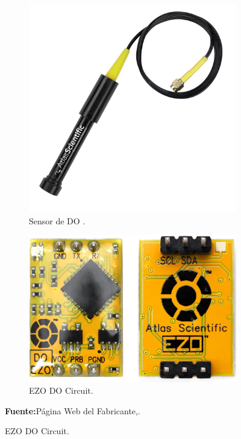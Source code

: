 \begin{figure}[H]
\caption[Sensor y EZO de DO.]{Sensor y EZO de DO de la empresa Atlas Scientific. }
     \centering
     \begin{subfigure}[b]{0.5\textwidth}
         \centering
         \includegraphics[width=\textwidth]{Imagenes/cap3/OD_Sensor.jpg}
	    \caption[Sensor de DO.]{Sensor de DO . }
        \label{fig:sensorDO}
     \end{subfigure}
     \hfill
     \begin{subfigure}[b]{0.35\textwidth}
         \centering
         \includegraphics[width=\textwidth]{Imagenes/cap3/EZO_DO.jpg}
         \caption[EZO DO Circuit]{EZO DO Circuit.}
        \label{fig:EZODO}
     \end{subfigure}
\textbf{Fuente:}P\'agina Web del Fabricante,\cite{atlas_dissolved_DO}.
\hfill
\end{figure}

